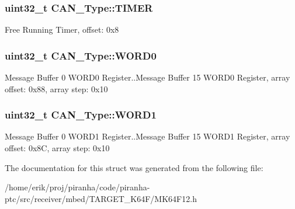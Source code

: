 \subsubsection[{\texorpdfstring{T\+I\+M\+ER}{TIMER}}]{ uint32\+\_\+t C\+A\+N\+\_\+\+Type\+::\+T\+I\+M\+ER}\hypertarget{structCAN__Type_afa5910590a69d21acc036991b3339982}{}\label{structCAN__Type_afa5910590a69d21acc036991b3339982}
Free Running Timer, offset\+: 0x8 
\subsubsection[{\texorpdfstring{W\+O\+R\+D0}{WORD0}}]{ uint32\+\_\+t C\+A\+N\+\_\+\+Type\+::\+W\+O\+R\+D0}\hypertarget{structCAN__Type_a9b8a9034dd90403ec14fc57e5b9cb2df}{}\label{structCAN__Type_a9b8a9034dd90403ec14fc57e5b9cb2df}
Message Buffer 0 W\+O\+R\+D0 Register..Message Buffer 15 W\+O\+R\+D0 Register, array offset\+: 0x88, array step\+: 0x10 
\subsubsection[{\texorpdfstring{W\+O\+R\+D1}{WORD1}}]{ uint32\+\_\+t C\+A\+N\+\_\+\+Type\+::\+W\+O\+R\+D1}\hypertarget{structCAN__Type_a4c0169767925af9329ab8fe65b0431b5}{}\label{structCAN__Type_a4c0169767925af9329ab8fe65b0431b5}
Message Buffer 0 W\+O\+R\+D1 Register..Message Buffer 15 W\+O\+R\+D1 Register, array offset\+: 0x8C, array step\+: 0x10 

The documentation for this struct was generated from the following file\+:\begin{DoxyCompactItemize}
\item 
/home/erik/proj/piranha/code/piranha-\/ptc/src/receiver/mbed/\+T\+A\+R\+G\+E\+T\+\_\+\+K64\+F/M\+K64\+F12.\+h\end{DoxyCompactItemize}
